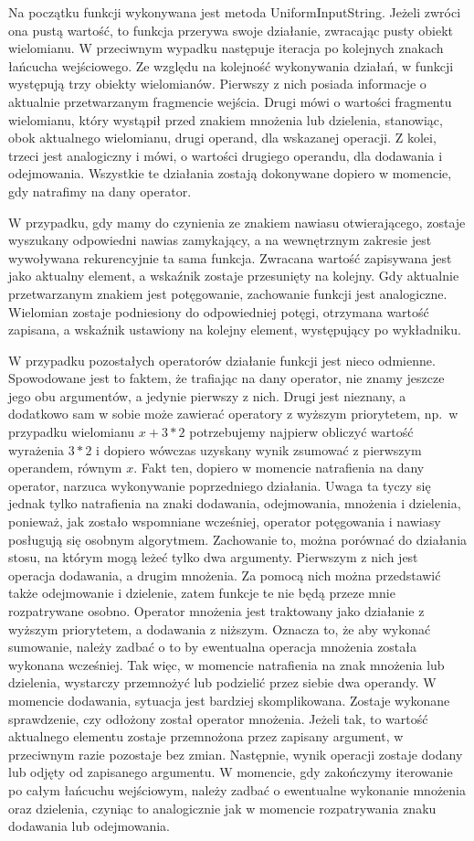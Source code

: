 \documentclass[oneside,a4paper]{book}
\begin{document}
	Na początku funkcji wykonywana jest metoda UniformInputString. Jeżeli zwróci ona pustą wartość, to funkcja przerywa swoje działanie, zwracając pusty obiekt wielomianu. W przeciwnym wypadku następuje iteracja po kolejnych znakach łańcucha wejściowego. Ze względu na kolejność wykonywania działań, w funkcji występują trzy obiekty wielomianów. Pierwszy z nich posiada informacje o aktualnie przetwarzanym fragmencie wejścia. Drugi mówi o wartości fragmentu wielomianu, który wystąpił przed znakiem mnożenia lub dzielenia, stanowiąc, obok aktualnego wielomianu, drugi operand, dla wskazanej operacji. Z kolei, trzeci jest analogiczny i mówi, o wartości drugiego operandu, dla dodawania i odejmowania. Wszystkie te działania zostają dokonywane dopiero w momencie, gdy natrafimy na dany operator.
	
	W przypadku, gdy mamy do czynienia ze znakiem nawiasu otwierającego, zostaje wyszukany odpowiedni nawias zamykający, a na wewnętrznym zakresie jest wywoływana rekurencyjnie ta sama funkcja. Zwracana wartość zapisywana jest jako aktualny element, a wskaźnik zostaje przesunięty na kolejny. Gdy aktualnie przetwarzanym znakiem jest potęgowanie, zachowanie funkcji jest analogiczne. Wielomian zostaje podniesiony do odpowiedniej potęgi, otrzymana wartość zapisana, a wskaźnik ustawiony na kolejny element, występujący po wykładniku.
	
	W przypadku pozostałych operatorów działanie funkcji jest nieco odmienne. Spowodowane jest to faktem, że trafiając na dany operator, nie znamy jeszcze jego obu argumentów, a jedynie pierwszy z nich. Drugi jest nieznany, a dodatkowo sam w sobie może zawierać operatory z wyższym priorytetem, np.\ w przypadku wielomianu $x+3*2$ potrzebujemy najpierw obliczyć wartość wyrażenia $3*2$ i dopiero wówczas uzyskany wynik zsumować z pierwszym operandem, równym $x$. Fakt ten, dopiero w momencie natrafienia na dany operator, narzuca wykonywanie poprzedniego działania. Uwaga ta tyczy się jednak tylko natrafienia na znaki dodawania, odejmowania, mnożenia i dzielenia, ponieważ, jak zostało wspomniane wcześniej, operator potęgowania i nawiasy posługują się osobnym algorytmem. Zachowanie to, można porównać do działania stosu, na którym mogą leżeć tylko dwa argumenty. Pierwszym z nich jest operacja dodawania, a drugim mnożenia. Za pomocą nich można przedstawić także odejmowanie i dzielenie, zatem funkcje te nie będą przeze mnie rozpatrywane osobno. Operator mnożenia jest traktowany jako działanie z wyższym priorytetem, a dodawania z niższym. Oznacza to, że aby wykonać sumowanie, należy zadbać o to by ewentualna operacja mnożenia została wykonana wcześniej. Tak więc, w momencie natrafienia na znak mnożenia lub dzielenia, wystarczy przemnożyć lub podzielić przez siebie dwa operandy. W momencie dodawania, sytuacja jest bardziej skomplikowana. Zostaje wykonane sprawdzenie, czy odłożony został operator mnożenia. Jeżeli tak, to wartość aktualnego elementu zostaje przemnożona przez zapisany argument, w przeciwnym razie pozostaje bez zmian. Następnie, wynik operacji zostaje dodany lub odjęty od zapisanego argumentu. W momencie, gdy zakończymy iterowanie po całym łańcuchu wejściowym, należy zadbać o ewentualne wykonanie mnożenia oraz dzielenia, czyniąc to analogicznie jak w momencie rozpatrywania znaku dodawania lub odejmowania.
	
\end{document}
